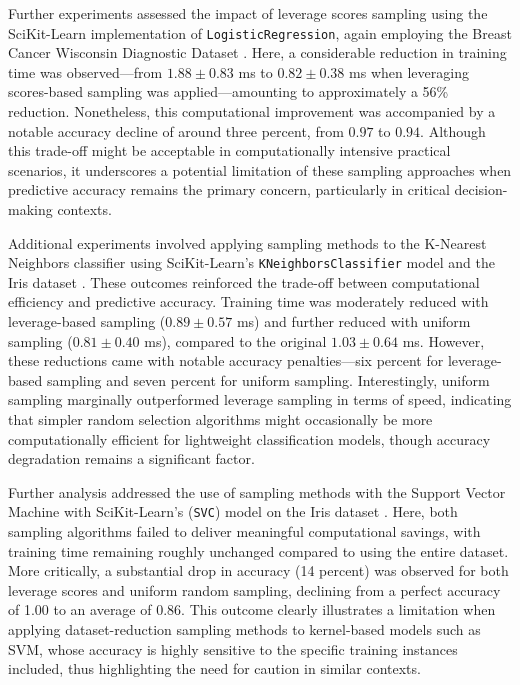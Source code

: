 \documentclass{article}
\theoremstyle{plain}
\theoremstyle{definition}
\theoremstyle{remark}
\begin{document}
Further experiments assessed the impact of leverage scores sampling using the SciKit-Learn implementation of \texttt{LogisticRegression}, again employing the Breast Cancer Wisconsin Diagnostic Dataset \cite{breastcancer}. Here, a considerable reduction in training time was observed—from $1.88 \pm 0.83$ ms to $0.82 \pm 0.38$ ms when leveraging scores-based sampling was applied—amounting to approximately a 56\% reduction. Nonetheless, this computational improvement was accompanied by a notable accuracy decline of around three percent, from $0.97$ to $0.94$. Although this trade-off might be acceptable in computationally intensive practical scenarios, it underscores a potential limitation of these sampling approaches when predictive accuracy remains the primary concern, particularly in critical decision-making contexts.

Additional experiments involved applying sampling methods to the K-Nearest Neighbors classifier using SciKit-Learn's \texttt{KNeighborsClassifier} model and the Iris dataset \cite{iris}. These outcomes reinforced the trade-off between computational efficiency and predictive accuracy. Training time was moderately reduced with leverage-based sampling ($0.89 \pm 0.57$ ms) and further reduced with uniform sampling ($0.81 \pm 0.40$ ms), compared to the original $1.03 \pm 0.64$ ms. However, these reductions came with notable accuracy penalties—six percent for leverage-based sampling and seven percent for uniform sampling. Interestingly, uniform sampling marginally outperformed leverage sampling in terms of speed, indicating that simpler random selection algorithms might occasionally be more computationally efficient for lightweight classification models, though accuracy degradation remains a significant factor.

Further analysis addressed the use of sampling methods with the Support Vector Machine with SciKit-Learn's (\texttt{SVC}) model on the Iris dataset \cite{iris}. Here, both sampling algorithms failed to deliver meaningful computational savings, with training time remaining roughly unchanged compared to using the entire dataset. More critically, a substantial drop in accuracy (14 percent) was observed for both leverage scores and uniform random sampling, declining from a perfect accuracy of 1.00 to an average of 0.86. This outcome clearly illustrates a limitation when applying dataset-reduction sampling methods to kernel-based models such as SVM, whose accuracy is highly sensitive to the specific training instances included, thus highlighting the need for caution in similar contexts.
\end{document}

